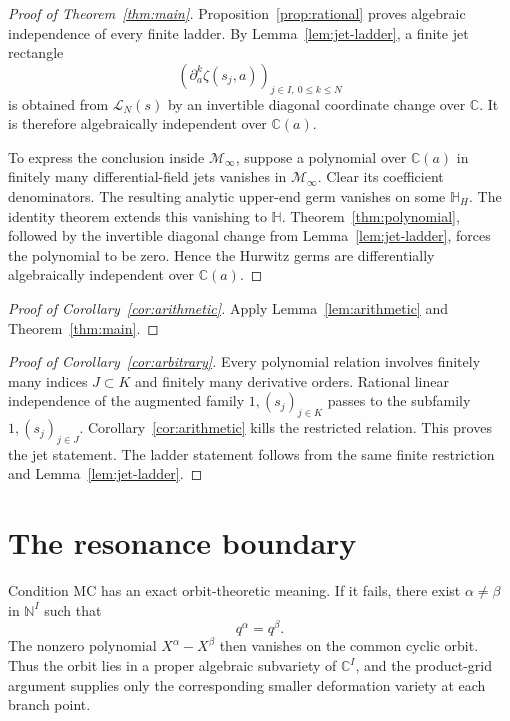 \documentclass[11pt,reqno]{amsart}
\theoremstyle{definition}
\theoremstyle{remark}
\newcommand{\C}{\mathbb C}
\newcommand{\N}{\mathbb N}
\newcommand{\HH}{\mathbb H}
\newcommand{\Minf}{\mathcal M_{\infty}}
\newcommand{\mc}{\mathrm{MC}}
\begin{document}
\begin{proof}[Proof of Theorem~\ref{thm:main}]
Proposition~\ref{prop:rational} proves algebraic independence of every finite
ladder.  By Lemma~\ref{lem:jet-ladder}, a finite jet rectangle
\[
  (\partial_a^k\zeta(s_j,a))_{j\in I,\ 0\leq k\leq N}
\]
is obtained from $\mathcal L_N(s)$ by an invertible diagonal coordinate
change over $\C$.  It is therefore algebraically independent over $\C(a)$.

To express the conclusion inside $\Minf$, suppose a polynomial over $\C(a)$
in finitely many differential-field jets vanishes in $\Minf$.  Clear its
coefficient denominators.  The resulting analytic upper-end germ vanishes on
some $\HH_H$.  The identity theorem extends this vanishing to $\HH$.
Theorem~\ref{thm:polynomial}, followed by the invertible diagonal change from
Lemma~\ref{lem:jet-ladder}, forces the polynomial to be zero.  Hence the
Hurwitz germs are differentially algebraically independent over $\C(a)$.
\end{proof}

\begin{proof}[Proof of Corollary~\ref{cor:arithmetic}]
Apply Lemma~\ref{lem:arithmetic} and Theorem~\ref{thm:main}.
\end{proof}

\begin{proof}[Proof of Corollary~\ref{cor:arbitrary}]
Every polynomial relation involves finitely many indices
$J\subset K$ and finitely many derivative orders.  Rational linear
independence of the augmented family $1,(s_j)_{j\in K}$ passes to the
subfamily $1,(s_j)_{j\in J}$.  Corollary~\ref{cor:arithmetic} kills the
restricted relation.  This proves the jet statement.  The ladder statement
follows from the same finite restriction and Lemma~\ref{lem:jet-ladder}.
\end{proof}

\section{The resonance boundary}\label{sec:boundary}

Condition $\mc$ has an exact orbit-theoretic meaning.  If it fails, there
exist $\alpha\neq\beta$ in $\N^I$ such that
\[
  q^\alpha=q^\beta.
\]
The nonzero polynomial $X^\alpha-X^\beta$ then vanishes on the common cyclic
orbit.  Thus the orbit lies in a proper algebraic subvariety of
$\C^I$, and the product-grid argument supplies only the corresponding
smaller deformation variety at each branch point.
\end{document}
